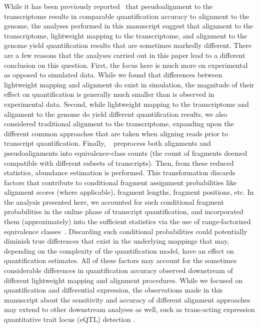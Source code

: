 While it has been previously
reported~\citep{direct_comparison} that pseudoalignment to the transcriptome
results in comparable quantification accuracy to alignment to the genome, the analyses
performed in this manuscript suggest that alignment to the transcriptome,
lightweight mapping to the transcriptome, and alignment to the genome yield
quantification results that are sometimes markedly different.
There are a few reasons that the analyses carried out in this paper lead to a
different conclusion on this question. First, the focus here is much more on
experimental as opposed to simulated data. While we found that differences
between lightweight mapping and alignment do exist in simulation, the magnitude
of their effect on quantification is generally much smaller than is observed in
experimental data. Second, while lightweight mapping to the transcriptome and alignment
to the genome do yield different quantification results, we also considered
traditional alignment to the
transcriptome, expanding upon the different common approaches that are taken
when aligning reads prior to transcript quantification. Finally, \citeauthor{direct_comparison}~\citep{direct_comparison} 
preprocess both alignments and
pseudoalignments into equivalence-class counts (the count of fragments deemed
compatible with different subsets of transcripts). Then, from these reduced
statistics, abundance estimation is performed. This transformation 
discards factors that contribute to conditional fragment assignment
probabilities like alignment scores (where applicable), fragment lengths, fragment positions, etc.
In the analysis presented here, we accounted for such conditional fragment
probabilities in the online phase of transcript quantification, and incorporated
them (approximately) into the sufficient statistics via the use of
range-factorized equivalence classes~\citep{ddfact}. Discarding such conditional
probabilities could potentially diminish true differences that exist in the
underlying mappings that may, depending on the complexity of the quantification
model, have an effect on quantification estimates. All of these factors may
account for the sometimes considerable differences in quantification accuracy
observed downstream of different lightweight mapping and alignment procedures.
While we focused on quantification and differential expression,
the observations made in this manuscript about the sensitivity
  and accuracy of different alignment approaches may extend to other
downstream analyses as well, such as trans-acting expression quantitative trait
locus (eQTL) detection \citep{saha2018false}.


